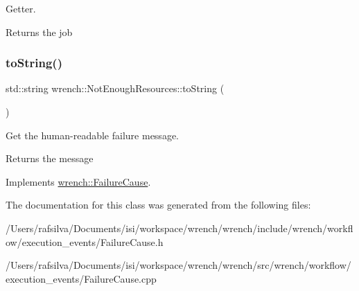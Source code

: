 Getter. 

\begin{DoxyReturn}{Returns}
the job 
\end{DoxyReturn}
\mbox{\label{classwrench_1_1_not_enough_resources_aeccad36aeccb259ac4c2d17752963269}} 
\subsubsection{\texorpdfstring{to\+String()}{toString()}}
{\footnotesize\ttfamily std\+::string wrench\+::\+Not\+Enough\+Resources\+::to\+String (\begin{DoxyParamCaption}{ }\end{DoxyParamCaption})\hspace{0.3cm}{\ttfamily [virtual]}}



Get the human-\/readable failure message. 

\begin{DoxyReturn}{Returns}
the message 
\end{DoxyReturn}


Implements \hyperlink{classwrench_1_1_failure_cause_afbad248ebe902409f2cd4f1d6f2b867d}{wrench\+::\+Failure\+Cause}.



The documentation for this class was generated from the following files\+:\begin{DoxyCompactItemize}
\item 
/\+Users/rafsilva/\+Documents/isi/workspace/wrench/wrench/include/wrench/workflow/execution\+\_\+events/Failure\+Cause.\+h\item 
/\+Users/rafsilva/\+Documents/isi/workspace/wrench/wrench/src/wrench/workflow/execution\+\_\+events/Failure\+Cause.\+cpp\end{DoxyCompactItemize}

